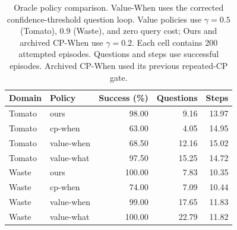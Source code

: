 \begin{table}[t]
\centering
\caption{Oracle policy comparison. Value-When uses the corrected confidence-threshold question loop. Value policies use $\gamma=0.5$ (Tomato), $0.9$ (Waste), and zero query cost; Ours and archived CP-When use $\gamma=0.2$. Each cell contains 200 attempted episodes. Questions and steps use successful episodes. Archived CP-When used its previous repeated-CP gate.}
\label{tab:policy_value_threshold_loop}
\begin{tabular}{llrrr}
\hline Domain & Policy & Success (\%) & Questions & Steps \\
\hline
Tomato & ours & 98.00 & 9.16 & 13.97 \\
Tomato & cp-when & 63.00 & 4.05 & 14.95 \\
Tomato & value-when & 68.50 & 12.16 & 15.02 \\
Tomato & value-what & 97.50 & 15.25 & 14.72 \\
Waste & ours & 100.00 & 7.83 & 10.35 \\
Waste & cp-when & 74.00 & 7.09 & 10.44 \\
Waste & value-when & 99.00 & 17.65 & 11.83 \\
Waste & value-what & 100.00 & 22.79 & 11.82 \\
\hline
\end{tabular}
\end{table}
